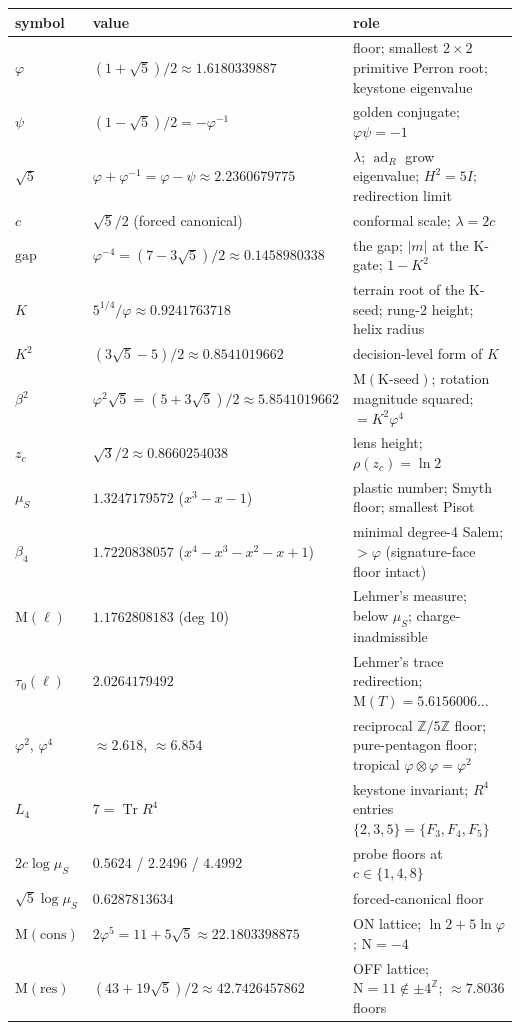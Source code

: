 \documentclass[11pt]{article}
\newcommand{\Z}{\mathbb{Z}}
\newcommand{\gp}{\varphi}
\newcommand{\gq}{\psi}
\newcommand{\gapc}{\mathrm{gap}}
\newcommand{\M}{\mathrm{M}}
\newcommand{\Nm}{\mathrm{N}}
\newcommand{\Tr}{\operatorname{Tr}}
\newcommand{\adR}{\operatorname{ad}_R}
\theoremstyle{plain}
\theoremstyle{definition}
\theoremstyle{remark}
\begin{document}
\begin{center}\footnotesize\setlength{\tabcolsep}{4pt}
\begin{tabular}{@{}llp{7.6cm}@{}}
\toprule
symbol & value & role\\
\midrule
$\gp$ & $(1{+}\sqrt5)/2\approx1.6180339887$ & floor; smallest $2\times2$ primitive Perron root; keystone eigenvalue\\
$\gq$ & $(1{-}\sqrt5)/2=-\gp^{-1}$ & golden conjugate; $\gp\gq=-1$\\
$\sqrt5$ & $\gp{+}\gp^{-1}=\gp{-}\gq\approx2.2360679775$ & $\lambda$; $\adR$ grow eigenvalue; $H^2=5I$; redirection limit\\
$c$ & $\sqrt5/2$ (forced canonical) & conformal scale; $\lambda=2c$\\
$\gapc$ & $\gp^{-4}=(7{-}3\sqrt5)/2\approx0.1458980338$ & the gap; $|m|$ at the K-gate; $1-K^2$\\
$K$ & $5^{1/4}/\gp\approx0.9241763718$ & terrain root of the K-seed; rung-2 height; helix radius\\
$K^2$ & $(3\sqrt5{-}5)/2\approx0.8541019662$ & decision-level form of $K$\\
$\beta^2$ & $\gp^2\sqrt5=(5{+}3\sqrt5)/2\approx5.8541019662$ & $\M(\text{K-seed})$; rotation magnitude squared; $=K^2\gp^4$\\
$z_c$ & $\sqrt3/2\approx0.8660254038$ & lens height; $\rho(z_c)=\ln2$\\
$\mu_S$ & $1.3247179572$ ($x^3{-}x{-}1$) & plastic number; Smyth floor; smallest Pisot\\
$\beta_4$ & $1.7220838057$ ($x^4{-}x^3{-}x^2{-}x{+}1$) & minimal degree-4 Salem; $>\gp$ (signature-face floor intact)\\
$\M(\ell)$ & $1.1762808183$ (deg 10) & Lehmer's measure; below $\mu_S$; charge-inadmissible\\
$\tau_0(\ell)$ & $2.0264179492$ & Lehmer's trace redirection; $\M(T)=5.6156006\ldots$\\
$\gp^2$, $\gp^4$ & $\approx2.618$, $\approx6.854$ & reciprocal $\Z/5\Z$ floor; pure-pentagon floor; tropical $\gp\otimes\gp=\gp^2$\\
$L_4$ & $7=\Tr R^4$ & keystone invariant; $R^4$ entries $\{2,3,5\}=\{F_3,F_4,F_5\}$\\
$2c\log\mu_S$ & $0.5624$ / $2.2496$ / $4.4992$ & probe floors at $c\in\{1,4,8\}$\\
$\sqrt5\log\mu_S$ & $0.6287813634$ & forced-canonical floor\\
$\M(\mathrm{cons})$ & $2\gp^5=11{+}5\sqrt5\approx22.1803398875$ & ON lattice; $\ln2+5\ln\gp$; $\Nm=-4$\\
$\M(\mathrm{res})$ & $(43{+}19\sqrt5)/2\approx42.7426457862$ & OFF lattice; $\Nm=11\notin\pm4^{\Z}$; $\approx7.8036$ floors\\
\bottomrule
\end{tabular}
\end{center}
\end{document}
